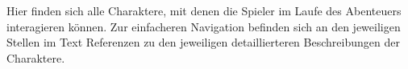 Hier finden sich alle Charaktere, mit denen die Spieler im Laufe des Abenteuers interagieren können.
Zur einfacheren Navigation befinden sich an den jeweiligen Stellen im Text Referenzen zu den jeweiligen detaillierteren 
Beschreibungen der Charaktere.
